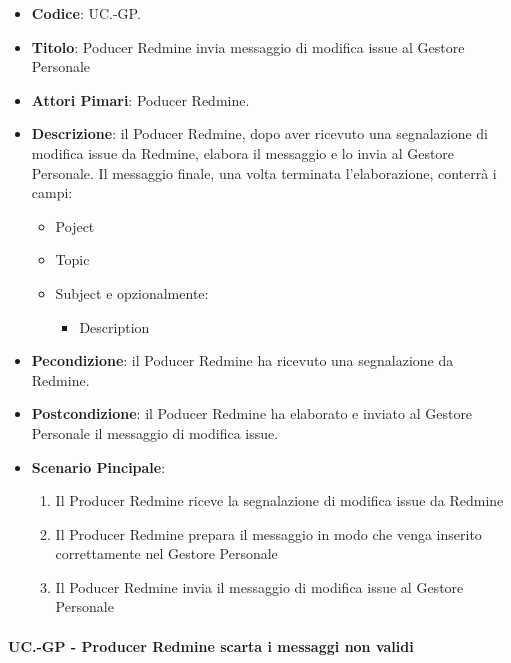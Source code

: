 		\begin{itemize}
			\item \textbf{Codice}: UC\theuccount.\thesubuccount-GP.
			\item \textbf{Titolo}: Poducer Redmine invia messaggio di modifica issue al Gestore Personale
			\item \textbf{Attori Pimari}: Poducer Redmine.
			\item \textbf{Descrizione}: il Poducer Redmine, dopo aver
			ricevuto una segnalazione di modifica issue da Redmine, elabora il messaggio e lo invia al Gestore Personale.
			Il messaggio finale, una volta terminata l'elaborazione, conterrà i campi:
			\begin{itemize}
				\item Poject
				\item Topic
				\item Subject e opzionalmente:
				\begin{itemize}
					\item Description
				\end{itemize}
			\end{itemize}
			\item \textbf{Pecondizione}: il Poducer Redmine ha ricevuto una segnalazione da Redmine.
			\item \textbf{Postcondizione}: il Poducer Redmine ha elaborato e inviato al Gestore Personale il messaggio di modifica issue.
			\item \textbf{Scenario Pincipale}: 
			\begin{enumerate}
				\item Il Producer Redmine riceve la segnalazione di modifica issue da Redmine
				\item Il Producer Redmine prepara il messaggio in modo che venga inserito correttamente nel Gestore Personale
				\item Il Poducer Redmine invia il messaggio di
				modifica issue al Gestore Personale
			\end{enumerate}
			
		\end{itemize}
	
	\paragraph{UC\theuccount.\thesubuccount-GP - Producer Redmine scarta i messaggi non validi}
	
